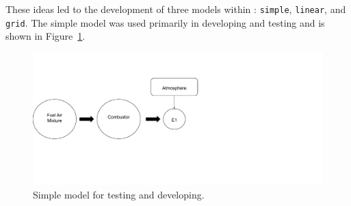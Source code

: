 \documentclass[smallextended,referee]{svjour3}
\begin{document}
These ideas led to the development of three models within \pyplume: \texttt{simple}, \texttt{linear}, and \texttt{grid}. The simple model was used primarily in developing and testing and is shown in Figure~\ref{fig:simple}. 

\begin{figure}[htb!]
    \centering
    \includegraphics[scale=\SCALE,trim=1cm 5cm 1cm 4cm]{examples/report/figs/simple.pdf}
    \caption{Simple model for testing and developing.}
    \label{fig:simple}
\end{figure}
\end{document}
